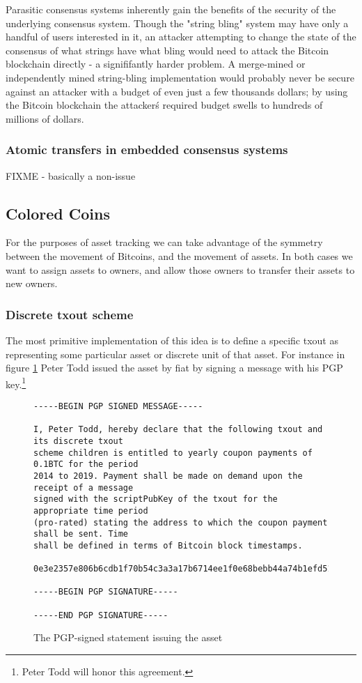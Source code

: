 \documentclass{article}
\begin{document}
Parasitic consensus systems inherently gain the benefits of the security of the
underlying consensus system. Though the "string bling" system may have only a
handful of users interested in it, an attacker attempting to change the state
of the consensus of what strings have what bling would need to attack the
Bitcoin blockchain directly - a signififantly harder problem. A merge-mined or
independently mined string-bling implementation would probably never be secure
against an attacker with a budget of even just a few thousands dollars; by
using the Bitcoin blockchain the attacker\'s required budget swells
to hundreds of millions of dollars.


\subsubsection{Atomic transfers in embedded consensus systems}

FIXME - basically a non-issue



\subsection{Colored Coins}

For the purposes of asset tracking we can take advantage of the symmetry
between the movement of Bitcoins, and the movement of assets. In both cases we
want to assign assets to owners, and allow those owners to transfer their
assets to new owners.


\subsubsection{Discrete txout scheme}

The most primitive implementation of this idea is to define a specific txout as
representing some particular asset or discrete unit of that asset. For instance
in figure \ref{fig:peter-bond} Peter Todd issued the asset by fiat by signing
a message with his PGP key.\footnote{Peter Todd will honor this agreement.}

\begin{figure}
\label{fig:peter-bond}
{\small
\begin{verbatim}
-----BEGIN PGP SIGNED MESSAGE-----

I, Peter Todd, hereby declare that the following txout and its discrete txout
scheme children is entitled to yearly coupon payments of 0.1BTC for the period
2014 to 2019. Payment shall be made on demand upon the receipt of a message
signed with the scriptPubKey of the txout for the appropriate time period
(pro-rated) stating the address to which the coupon payment shall be sent. Time
shall be defined in terms of Bitcoin block timestamps.

0e3e2357e806b6cdb1f70b54c3a3a17b6714ee1f0e68bebb44a74b1efd512098:0

-----BEGIN PGP SIGNATURE-----

-----END PGP SIGNATURE-----
\end{verbatim}
}
\caption{The PGP-signed statement issuing the asset}
\end{figure}
\end{document}
